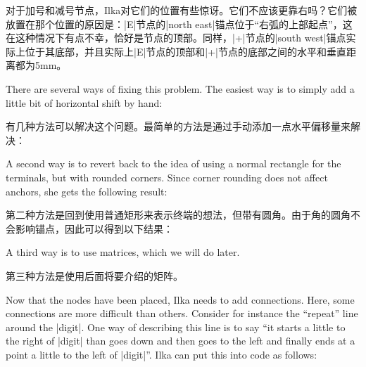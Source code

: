 对于加号和减号节点，Ilka对它们的位置有些惊讶。它们不应该更靠右吗？它们被放置在那个位置的原因是：|E|节点的|north east|锚点位于“右弧的上部起点”，这在这种情况下有点不幸，恰好是节点的顶部。同样，|+|节点的|south west|锚点实际上位于其底部，并且实际上|E|节点的顶部和|+|节点的底部之间的水平和垂直距离都为5mm。

There are several ways of fixing this problem. The easiest way is to simply add
a little bit of horizontal shift by hand:

有几种方法可以解决这个问题。最简单的方法是通过手动添加一点水平偏移量来解决：

%
\begin{codeexample}[preamble={\usetikzlibrary{positioning,shapes.misc}}]
\end{codeexample}

A second way is to revert back to the idea of using a normal rectangle for the
terminals, but with rounded corners. Since corner rounding does not affect
anchors, she gets the following result:

第二种方法是回到使用普通矩形来表示终端的想法，但带有圆角。由于角的圆角不会影响锚点，因此可以得到以下结果：

%
\begin{codeexample}[preamble={\usetikzlibrary{positioning,shapes.misc}}]
\end{codeexample}
%
A third way is to use matrices, which we will do later.

第三种方法是使用后面将要介绍的矩阵。

Now that the nodes have been placed, Ilka needs to add connections. Here, some
connections are more difficult than others. Consider for instance the
``repeat'' line around the |digit|. One way of describing this line is to say
``it starts a little to the right of |digit| than goes down and then goes to
the left and finally ends at a point a little to the left of |digit|''. Ilka
can put this into code as follows:

